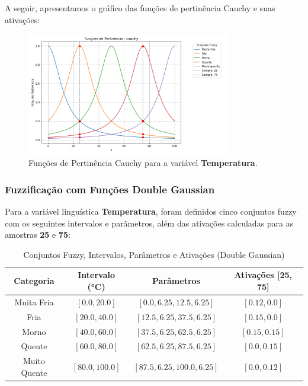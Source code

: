 \documentclass[a4paper,12pt]{article}
\begin{document}
A seguir, apresentamos o gráfico das funções de pertinência Cauchy e suas ativações:

\begin{figure}[H]
    \centering
    \includegraphics[width=0.8\textwidth]{img/funções_de_pertinência_cauchy_fuzzificado.png}
    \caption{Funções de Pertinência Cauchy para a variável \textbf{Temperatura}.}
\end{figure}

\subsubsection{Fuzzificação com Funções Double Gaussian}

Para a variável linguística \textbf{Temperatura}, foram definidos cinco conjuntos fuzzy com os seguintes intervalos e parâmetros, além das ativações calculadas para as amostras \textbf{25} e \textbf{75}:

\begin{table}[H]
\centering
\caption{Conjuntos Fuzzy, Intervalos, Parâmetros e Ativações (Double Gaussian)}
\begin{tabular}{|c|c|c|c|}
\hline
\textbf{Categoria}    & \textbf{Intervalo (°C)} & \textbf{Parâmetros}               & \textbf{Ativações [25, 75]} \\ \hline
Muita Fria            & $[0.0, 20.0]$          & $[0.0, 6.25, 12.5, 6.25]$         & $[0.12, 0.0]$              \\ \hline
Fria                  & $[20.0, 40.0]$         & $[12.5, 6.25, 37.5, 6.25]$        & $[0.15, 0.0]$              \\ \hline
Morno                 & $[40.0, 60.0]$         & $[37.5, 6.25, 62.5, 6.25]$        & $[0.15, 0.15]$             \\ \hline
Quente                & $[60.0, 80.0]$         & $[62.5, 6.25, 87.5, 6.25]$        & $[0.0, 0.15]$              \\ \hline
Muito Quente          & $[80.0, 100.0]$        & $[87.5, 6.25, 100.0, 6.25]$       & $[0.0, 0.12]$              \\ \hline
\end{tabular}
\end{table}
\end{document}

